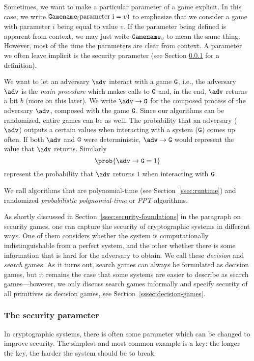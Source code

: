 Sometimes, we want to make a particular parameter of a game explicit. In this case, we write $\text{\texttt{Gamename}}_(\text{parameter i}=v)$ to emphasize that we consider a game with parameter $i$ being equal to value $v$. If the parameter being defined is apparent from context, we may just write $\text{\texttt{Gamename}}_v$ to mean the same thing. However, most of the time the parameters are clear from context. A parameter we often leave implicit is the security parameter (see Section \ref{sssec:security-parameter} for a definition).

We want to let an adversary $\adv$ interact with a game $\text{\texttt{G}}$, i.e., the adversary $\adv$ is the \emph{main procedure} which makes calls to $\text{\texttt{G}}$ and, in the end, $\adv$ returns a bit $b$ (more on this later). We write $\adv\rightarrow\M{G}$ for the composed process of the adversary $\adv$, composed with the game $\text{\texttt{G}}$.
Since our algorithms can be randomized, entire games can be as well. The probability that an adversary ($\adv$) outputs a certain values when interacting with a system ($\text{\texttt{G}}$) comes up often. If both $\adv$ and $\text{\texttt{G}}$ were deterministic, $\adv \circ \M{G}$ would represent the value that $\adv$ returns. Similarly
\[\prob{\adv \circ \M{G} = 1}\]
represent the probability that $\adv$ returns $1$ when interacting with $\text{\texttt{G}}$.

We call algorithms that are polynomial-time (see Section~\ref{ssec:runtime}) and randomized \emph{probabilistic polynomial-time} or \emph{PPT} algorithms.

As shortly discussed in Section~\ref{ssec:security-foundations} in the paragraph on security games, one can capture the security of cryptographic systems in different ways. One of them considers whether the system is computationally indistinguishable from a perfect system, and the other whether there is some information that is hard for the adversary to obtain. We call these \emph{decision} and \emph{search} games. As it turns out, search games can always be formulated as decision games, but it remains the case that some systems are easier to describe as search games---however, we only discuss search games informally and specify security of all primitives as decision games, see Section~\ref{sssec:decision-games}.

\subsubsection{The security parameter}\label{sssec:security-parameter}
In cryptographic systems, there is often some parameter which can be changed to improve security. The simplest and most common example is a key: the longer the key, the harder the system should be to break.


